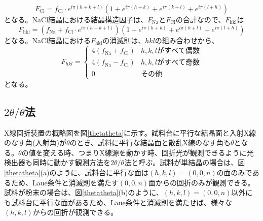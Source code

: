 \documentclass[11pt,a4j,uplatex]{jsarticle}
\begin{document}
\begin{equation}
  F_{\mathrm{Cl}}=f_{\mathrm{Cl}}\cdot e^{i\pi(h+k+l)}(1+e^{i\pi(h+k)}+e^{i\pi(k+l)}+e^{i\pi(l+h)})
\end{equation}
となる。NaCl結晶における結晶構造因子は、$F_{\mathrm{Na}}$と$F_{\mathrm{Cl}}$の合計なので、$F_{\mathrm{hkl}}$は
\begin{equation}
  F_{\mathrm{hkl}}=(f_{\mathrm{Na}}+f_{\mathrm{Cl}}\cdot e^{i\pi(h+k+l)})(1+e^{i\pi(h+k)}+e^{i\pi(k+l)}+e^{i\pi(l+h)})
\end{equation}
となる。NaCl結晶における$F_{\mathrm{hkl}}$の消滅則は、$hkl$の組み合わせから、
\begin{subequations}
\begin{equation}
F_{hkl}=\begin{cases}
4(f_{\mathrm{Na}}+f_{\mathrm{Cl}}) & h,k,lがすべて偶数 \\
4(f_{\mathrm{Na}}-f_{\mathrm{Cl}}) & h,k,lがすべて奇数\\
0 & その他
\end{cases}
\end{equation}
\end{subequations}
となる。
\newpage
\subsection{$2\theta/\theta$法}

X線回折装置の概略図を図\ref{thetatheta}に示す。試料台に平行な結晶面と入射X線のなす角(入射角)が$\theta$のとき、試料に平行な結晶面と散乱X線のなす角も$\theta$となる。$\theta$の値を変える時、つまりX線源を動かす時、回折光が観測できるように光検出器も同時に動かす観測方法を$2\theta/\theta$法と呼ぶ。試料が単結晶の場合は、図\ref{thetatheta}(a)のように、試料台に平行な面は$(h,k,l)=(0,0,n)$の面のみであるため、Laue条件と消滅則を満たす$(0,0,n)$面からの回折のみが観測できる。試料が粉末の場合は、図\ref{thetatheta}(b)のように、$(h,k,l)=(0,0,n)$以外にも試料台に平行な面があるため、Laue条件と消滅則を満たせば、様々な$(h,k,l)$からの回折が観測できる。
\end{document}
